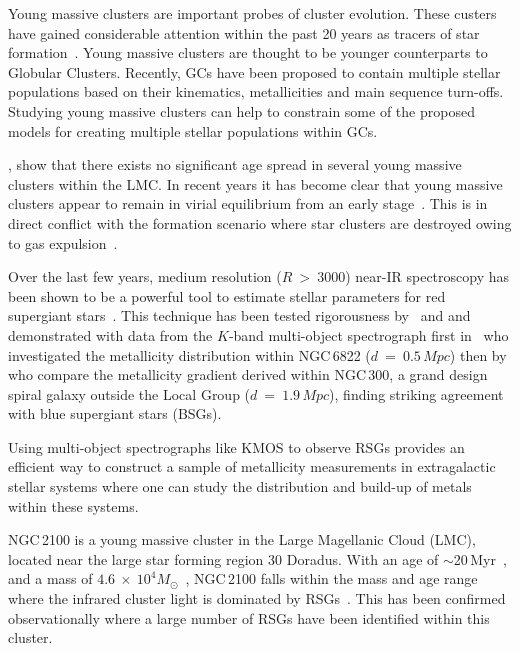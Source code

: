 \documentclass[useAMS,usenatbib]{mn2e}
\begin{document}
Young massive clusters are important probes of cluster evolution.
These custers have gained considerable attention within the past 20 years as tracers of star formation~\citep[e.g.][]{1995AJ....109..960W,1997AJ....114.2381M,1999AJ....118..752Z}.
Young massive clusters are thought to be younger counterparts to Globular Clusters.
Recently, GCs have been proposed to contain multiple stellar populations based on their kinematics, metallicities and main sequence turn-offs.
Studying young massive clusters can help to constrain some of the proposed models for creating multiple stellar populations within GCs.


\citet{2015A&A...575A..62N}, show that there exists no significant age spread in several young massive clusters within the LMC.
In recent years it has become clear that young massive clusters appear to remain in virial equilibrium from an early stage~\citep{2014prpl.conf..291L}.
This is in direct conflict with the formation scenario where star clusters are destroyed owing to gas expulsion~\citep[i.e. infant mortality,][]{2003ARA&A..41...57L}.

Over the last few years, medium resolution ($R~>~3000$) near-IR spectroscopy has been shown to be a powerful tool to estimate stellar parameters for red supergiant stars~\citep[RSGs;][]{2010MNRAS.407.1203D}.
This technique has been tested rigorousness by~\cite{2014ApJ...788...58G} and \cite{2015ApJ...806...21D} and demonstrated with data from the $K$-band multi-object spectrograph first in~\cite{2015ApJ...803...14P} who investigated the metallicity distribution within NGC\,6822 ($d~=~0.5\,Mpc$) then by
\cite{2015ApJ...805..182G} who compare the metallicity gradient derived within NGC\,300, a grand design spiral galaxy outside the Local Group ($d~=~1.9\,Mpc$), finding striking agreement with blue supergiant stars (BSGs).

Using multi-object spectrographs like KMOS to observe RSGs provides an efficient way to construct a sample of metallicity measurements in extragalactic stellar systems where one can study the distribution and build-up of metals within these systems.


NGC\,2100 is a young massive cluster in the Large Magellanic Cloud (LMC), located near the large star forming region 30 Doradus.
With an age of $\sim$20\,Myr~\citep{1991ApJS...76..185E,2015A&A...575A..62N}, and a mass of $4.6~\times~10^4M_{\odot}$~\citep[assuming~\cite{1966AJ.....71...64K} profiles]{2005ApJS..161..304M}, NGC\,2100 falls within the mass and age range where the infrared cluster light is dominated by RSGs~\citep{2013MNRAS.430L..35G}.
This has been confirmed observationally where a large number of RSGs have been identified within this cluster.
\end{document}
